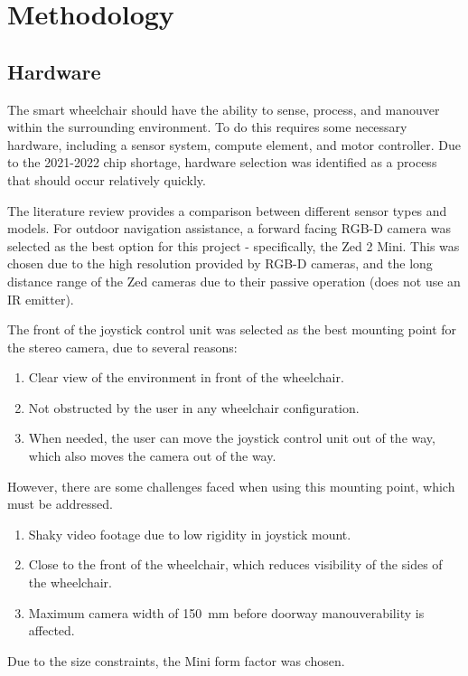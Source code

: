 \documentclass[12pt]{article}
\begin{document}
\section{Methodology}

\subsection{Hardware}
The smart wheelchair should have the ability to sense, process, and manouver within the surrounding environment.
To do this requires some necessary hardware, including a sensor system, compute element, and motor controller.
Due to the 2021-2022 chip shortage, hardware selection was identified as a process that should occur relatively quickly.

The literature review provides a comparison between different sensor types and models. For outdoor navigation assistance,
a forward facing RGB-D camera was selected as the best option for this project - specifically, the Zed 2 Mini.
This was chosen due to the high resolution provided by RGB-D cameras, and the long distance range of the Zed cameras due to 
their passive operation (does not use an IR emitter).

The front of the joystick control unit was selected as the best mounting point for the
stereo camera, due to several reasons:
\begin{enumerate}[topsep=0pt,itemsep=-1ex,partopsep=1ex,parsep=1ex]
    \item Clear view of the environment in front of the wheelchair.
    \item Not obstructed by the user in any wheelchair configuration.
    \item When needed, the user can move the joystick control unit out of the way,
            which also moves the camera out of the way.
\end{enumerate}
However, there are some challenges faced when using this mounting point, which must be addressed.
\begin{enumerate}[topsep=0pt,itemsep=-1ex,partopsep=1ex,parsep=1ex]
    \item Shaky video footage due to low rigidity in joystick mount.
    \item Close to the front of the wheelchair, which reduces visibility of the sides of the wheelchair.
    \item Maximum camera width of \SI{150}{\milli\metre} before doorway manouverability is affected.
\end{enumerate}
Due to the size constraints, the Mini form factor was chosen.
\end{document}
